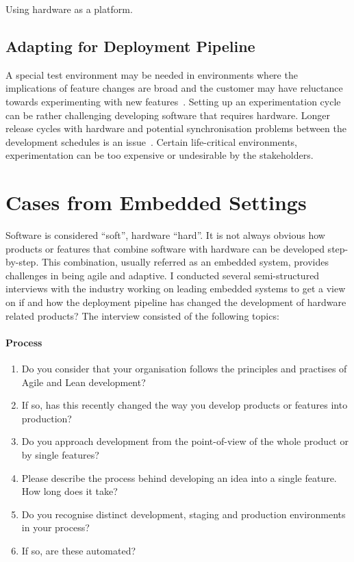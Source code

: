 \documentclass[english]{tktltiki2}
\begin{document}
Using hardware as a platform.

\subsection{Adapting for Deployment Pipeline}

A special test environment may be needed in environments where the implications of feature changes are broad and the customer may have reluctance towards experimenting with new features~\cite{FGM14}. Setting up an experimentation cycle can be rather challenging developing software that requires hardware. Longer release cycles with hardware and potential synchronisation problems between the development schedules is an issue~\cite{FGM14}. Certain life-critical environments, experimentation can be too expensive or undesirable by the stakeholders.


\section{Cases from Embedded Settings}

Software is considered “soft”, hardware “hard”. It is not always obvious how products or features that combine software with hardware can be developed step-by-step. This combination, usually referred as an embedded system, provides challenges in being agile and adaptive. I conducted several semi-structured interviews with the industry working on leading embedded systems to get a view on if and how the deployment pipeline has changed the development of hardware related products? The interview consisted of the following topics:

\paragraph{Process}

\begin{enumerate}

    \item Do you consider that your organisation follows the principles and practises of Agile and Lean development?
    \item If so, has this recently changed the way you develop products or features into production?
    \item Do you approach development from the point-of-view of the whole product or by single features?
    \item Please describe the process behind developing an idea into a single feature. How long does it take?
    \item Do you recognise distinct development, staging and production environments in your process?
    \item If so, are these automated?

\end{enumerate}
\end{document}
